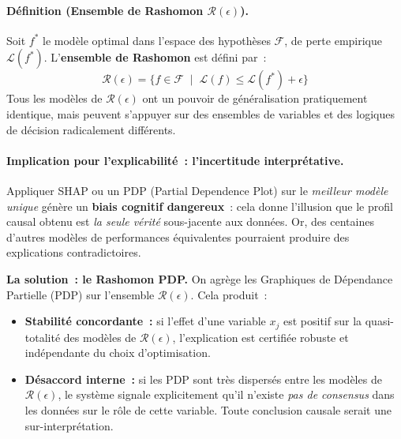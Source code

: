 \paragraph{Définition (Ensemble de Rashomon $\mathcal{R}(\epsilon)$).}
Soit $f^*$ le modèle optimal dans l'espace des hypothèses $\mathcal{F}$, de perte empirique
$\mathcal{L}(f^*)$. L'\textbf{ensemble de Rashomon} est défini par~:
\begin{equation}
  \mathcal{R}(\epsilon) = \bigl\{f \in \mathcal{F} \;\mid\; \mathcal{L}(f) \leq \mathcal{L}(f^*) + \epsilon\bigr\}
  \label{eq:rashomon}
\end{equation}
Tous les modèles de $\mathcal{R}(\epsilon)$ ont un pouvoir de généralisation pratiquement
identique, mais peuvent s'appuyer sur des ensembles de variables et des logiques de décision
radicalement différents.

\paragraph{Implication pour l'explicabilité~: l'incertitude interprétative.}

Appliquer SHAP ou un PDP (Partial Dependence Plot) sur le \textit{meilleur modèle unique}
génère un \textbf{biais cognitif dangereux}~: cela donne l'illusion que le profil causal
obtenu est \textit{la seule vérité} sous-jacente aux données. Or, des centaines d'autres
modèles de performances équivalentes pourraient produire des explications contradictoires.

\textbf{La solution~: le Rashomon PDP.} On agrège les Graphiques de Dépendance Partielle
(PDP) sur l'ensemble $\mathcal{R}(\epsilon)$. Cela produit~:

\begin{itemize}
  \item \textbf{Stabilité concordante~:} si l'effet d'une variable $x_j$ est positif
        sur la quasi-totalité des modèles de $\mathcal{R}(\epsilon)$, l'explication est
        certifiée robuste et indépendante du choix d'optimisation.

  \item \textbf{Désaccord interne~:} si les PDP sont très dispersés entre les modèles
        de $\mathcal{R}(\epsilon)$, le système signale explicitement qu'il n'existe
        \textit{pas de consensus} dans les données sur le rôle de cette variable. Toute
        conclusion causale serait une sur-interprétation.
\end{itemize}

